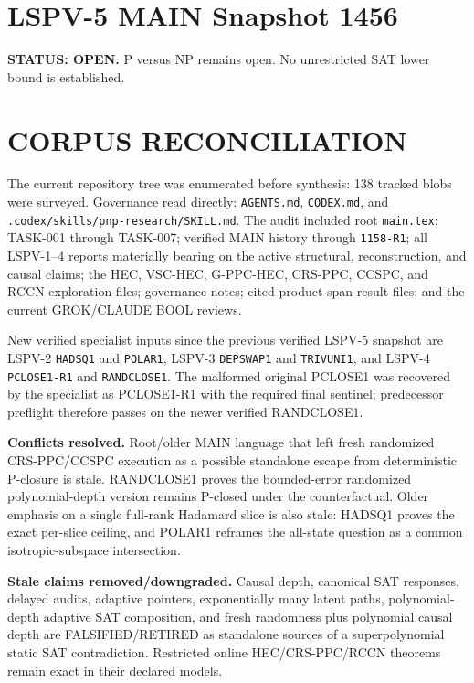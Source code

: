 \documentclass[11pt]{article}
\begin{document}
\section*{LSPV-5 MAIN Snapshot 1456}
\textbf{STATUS: OPEN.} P versus NP remains open. No unrestricted SAT lower bound is established.

\section*{CORPUS RECONCILIATION}
The current repository tree was enumerated before synthesis: 138 tracked blobs were surveyed. Governance read directly: \texttt{AGENTS.md}, \texttt{CODEX.md}, and \texttt{.codex/skills/pnp-research/SKILL.md}. The audit included root \texttt{main.tex}; TASK-001 through TASK-007; verified MAIN history through \texttt{1158-R1}; all LSPV-1--4 reports materially bearing on the active structural, reconstruction, and causal claims; the HEC, VSC-HEC, G-PPC-HEC, CRS-PPC, CCSPC, and RCCN exploration files; governance notes; cited product-span result files; and the current GROK/CLAUDE BOOL reviews.

New verified specialist inputs since the previous verified LSPV-5 snapshot are LSPV-2 \texttt{HADSQ1} and \texttt{POLAR1}, LSPV-3 \texttt{DEPSWAP1} and \texttt{TRIVUNI1}, and LSPV-4 \texttt{PCLOSE1-R1} and \texttt{RANDCLOSE1}. The malformed original PCLOSE1 was recovered by the specialist as PCLOSE1-R1 with the required final sentinel; predecessor preflight therefore passes on the newer verified RANDCLOSE1.

\textbf{Conflicts resolved.} Root/older MAIN language that left fresh randomized CRS-PPC/CCSPC execution as a possible standalone escape from deterministic P-closure is stale. RANDCLOSE1 proves the bounded-error randomized polynomial-depth version remains P-closed under the counterfactual. Older emphasis on a single full-rank Hadamard slice is also stale: HADSQ1 proves the exact per-slice ceiling, and POLAR1 reframes the all-state question as a common isotropic-subspace intersection.

\textbf{Stale claims removed/downgraded.} Causal depth, canonical SAT responses, delayed audits, adaptive pointers, exponentially many latent paths, polynomial-depth adaptive SAT composition, and fresh randomness plus polynomial causal depth are FALSIFIED/RETIRED as standalone sources of a superpolynomial static SAT contradiction. Restricted online HEC/CRS-PPC/RCCN theorems remain exact in their declared models.
\end{document}
